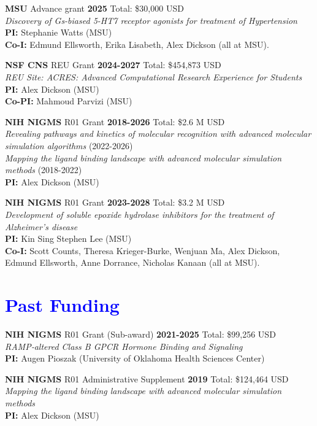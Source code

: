 \documentclass[margin,line]{res}
\begin{document}
\begin{resume}
{\bf MSU} Advance grant \hfill {\bf 2025} Total: \$30,000 USD \\
\emph{Discovery of Gs-biased 5-HT7 receptor agonists for treatment of Hypertension} \\
     {\bf PI:} Stephanie Watts (MSU)\\
     {\bf Co-I:} Edmund Ellsworth, Erika Lisabeth, Alex Dickson (all at MSU).

{\bf NSF CNS} REU Grant \hfill {\bf 2024-2027} Total: \$454,873 USD \\
\emph{REU Site: ACRES: Advanced Computational Research Experience for Students}\\
     {\bf PI:} Alex Dickson (MSU) \\
     {\bf Co-PI:} Mahmoud Parvizi (MSU) 

{\bf NIH NIGMS} R01 Grant \hfill {\bf 2018-2026} Total: \$2.6 M USD \\
\emph{Revealing pathways and kinetics of molecular recognition with advanced molecular simulation algorithms} (2022-2026)\\
\emph{Mapping the ligand binding landscape with advanced molecular simulation methods} (2018-2022)\\
{\bf PI:} Alex Dickson (MSU)

{\bf NIH NIGMS} R01 Grant \hfill {\bf 2023-2028} Total: \$3.2 M USD \\
\emph{Development of soluble epoxide hydrolase inhibitors for the treatment of Alzheimer's disease} \\
     {\bf PI:} Kin Sing Stephen Lee (MSU) \\
     {\bf Co-I:} Scott Counts, Theresa Krieger-Burke, Wenjuan Ma, Alex Dickson, Edmund Ellsworth, Anne Dorrance, Nicholas Kanaan (all at MSU).

\section{\sc \textcolor{blue}{Past Funding} }

{\bf NIH NIGMS} R01 Grant (Sub-award) \hfill {\bf 2021-2025} Total: \$99,256 USD \\
\emph{RAMP‐altered Class B GPCR Hormone Binding and Signaling}\\
{\bf PI:} Augen Pioszak (University of Oklahoma Health Sciences Center)

{\bf NIH NIGMS} R01 Administrative Supplement \hfill {\bf 2019} Total: \$124,464 USD \\
\emph{Mapping the ligand binding landscape with advanced molecular simulation methods}\\
{\bf PI:} Alex Dickson (MSU)


\end{resume}
\end{document}
